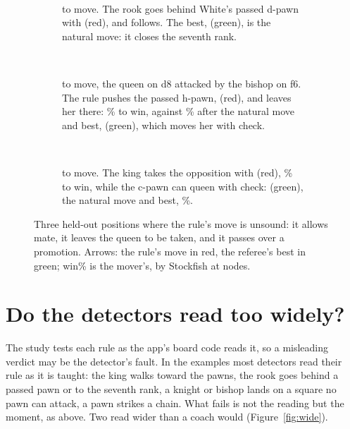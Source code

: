 \documentclass[11pt]{article}
\begin{document}
\ExampleTable

\begin{figure}[ht]
\centering
\begin{subfigure}[t]{0.32\textwidth}
\centering
\FaBoard\\[0.3em]
{\scriptsize \FaFen}
\caption{\FaMover{} to move. The rook goes behind White's passed d-pawn with \FaR{} (red), and
\FaMate{} follows. The best, \FaBest{} (green), is the natural move: it closes the seventh rank.}
\label{fig:mate}
\end{subfigure}\hfill
\begin{subfigure}[t]{0.32\textwidth}
\centering
\FbBoard\\[0.3em]
{\scriptsize \FbFen}
\caption{\FbMover{} to move, the queen on d8 attacked by the bishop on f6. The rule pushes the
passed h-pawn, \FbR{} (red), and leaves her there: \FbRWp\% to win, against \FbBestWp\% after the
natural move and best, \FbBest{} (green), which moves her with check.}
\label{fig:loose}
\end{subfigure}\hfill
\begin{subfigure}[t]{0.32\textwidth}
\centering
\FcBoard\\[0.3em]
{\scriptsize \FcFen}
\caption{\FcMover{} to move. The king takes the opposition with \FcR{} (red), \FcRWp\% to win,
while the c-pawn can queen with check: \FcBest{} (green), the natural move and best, \FcBestWp\%.}
\label{fig:forcing}
\end{subfigure}
\caption{Three held-out positions where the rule's move is unsound: it allows mate, it leaves the
queen to be taken, and it passes over a promotion. Arrows: the rule's move in red, the referee's
best in green; win\% is the mover's, by Stockfish at \GradeNodes{} nodes.}
\label{fig:kinds}
\end{figure}

\section{Do the detectors read too widely?}

The study tests each rule as the app's board code reads it, so a misleading verdict may be the
detector's fault. In the examples most detectors read their rule as it is taught: the king walks
toward the pawns, the rook goes behind a passed pawn or to the seventh rank, a knight or bishop lands
on a square no pawn can attack, a pawn strikes a chain. What fails is not the reading but the
moment, as above. Two read wider than a coach would (Figure~\ref{fig:wide}).
\end{document}
